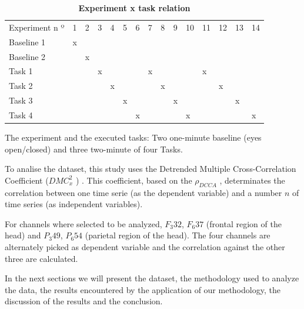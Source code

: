 \documentclass[10pt,letterpaper]{article}
\newlength\savedwidth
\newcommand\thickhline{\noalign{\global\savedwidth\arrayrulewidth\global\arrayrulewidth 2pt}%
\hline
\noalign{\global\arrayrulewidth\savedwidth}}
\newcommand{\dmc}{\(DMC_x^2\) }
\newcommand{\pdcca}{\({\rho}_{DCCA}\) }
\begin{document}
\begin{table}[!ht]
  \centering
  \caption{
  {\bf Experiment x task relation}}

    \begin{tabular}{|l|l|l|l|l|l|l|l|l|l|l|l|l|l|l|}
    \hline
    Experiment n º & 1 & 2 & 3 & 4 & 5 & 6 & 7 & 8 & 9 & 10 & 11 & 12 & 13 & 14 \\ \thickhline
    Baseline 1     & x &   &   &   &   &   &   &   &   &    &    &    &    &    \\ \hline
    Baseline 2     &   & x &   &   &   &   &   &   &   &    &    &    &    &    \\ \hline
    Task 1         &   &   & x &   &   &   & x &   &   &    & x  &    &    &    \\ \hline
    Task 2         &   &   &   & x &   &   &   & x &   &    &    & x  &    &    \\ \hline
    Task 3         &   &   &   &   & x &   &   &   & x &    &    &    & x  &    \\ \hline
    Task 4         &   &   &   &   &   & x &   &   &   & x  &    &    &    & x  \\ \hline
    \end{tabular}

  \begin{flushleft} The experiment and the executed tasks: Two one-minute baseline (eyes open/closed) and three two-minute of four Tasks.
  \end{flushleft}
  \label{table1}
  \end{table}

To analise the dataset, this study uses the Detrended Multiple Cross-Correlation Coefficient (\dmc) \cite{Zebende2018}. This coefficient, based on the \pdcca \cite{Zebende2011}, determinates the correlation between one time serie (as the dependent variable) and a number \(n\) of time series (as independent variables).

For channels where selected to be analyzed, \(F_{3}32\), \(F_{6}37\) (frontal region of the head) and \(P_{3}49\), \(P_{6}54\) (parietal region of the head). The four channels are alternately picked as dependent variable and the correlation against the other three are calculated.

In the next sections we will present the dataset, the methodology used to analyze the data, the results encountered by the application of our methodology, the discussion of the results and the conclusion.
\end{document}
